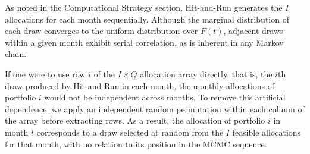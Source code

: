As noted in the Computational Strategy section, Hit-and-Run generates the $I$ allocations for each month sequentially. Although the marginal distribution of each draw converges to the uniform distribution over $F(t)$, adjacent draws within a given month exhibit serial correlation, as is inherent in any Markov chain.

If one were to use row $i$ of the $I \times Q$ allocation array directly, that is, the $i$th draw produced by Hit-and-Run in each month, the monthly allocations of portfolio $i$ would not be independent across months. To remove this artificial dependence, we apply an independent random permutation within each column of the array before extracting rows. As a result, the allocation of portfolio $i$ in month $t$ corresponds to a draw selected at random from the $I$ feasible allocations for that month, with no relation to its position in the MCMC sequence.

